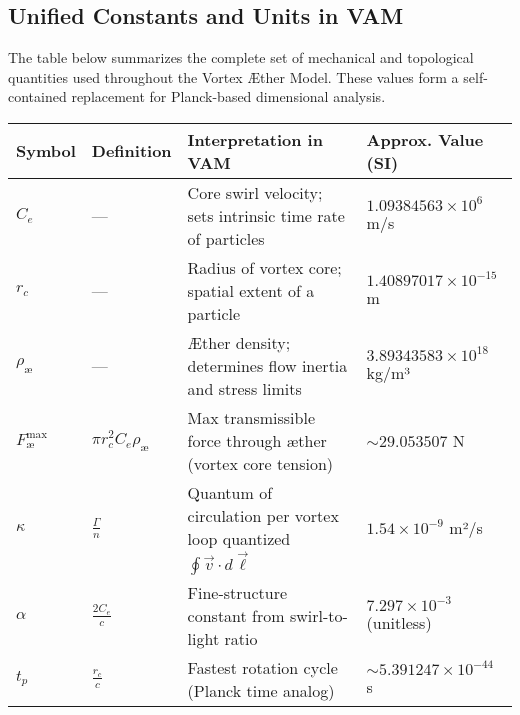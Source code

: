 \subsection*{Unified Constants and Units in VAM}

The table below summarizes the complete set of mechanical and topological quantities used throughout the Vortex Æther Model. These values form a self-contained replacement for Planck-based dimensional analysis.


\begin{table}[H]
    \centering
    \footnotesize
    \renewcommand{\arraystretch}{1.3}
    \begin{tabular}{|l|l|l|l|}
        \hline
        \textbf{Symbol} & \textbf{Definition} & \textbf{Interpretation in VAM} & \textbf{Approx. Value (SI)} \\
        \hline

        $C_e$ &
        — &
        Core swirl velocity; sets intrinsic time rate of particles &
        $1.09384563 \times 10^6$ m/s \\
        \hline

        $r_c$ &
        — &
        Radius of vortex core; spatial extent of a particle &
        $1.40897017 \times 10^{-15}$ m \\
        \hline

        $\rho_\text{\ae}$ &
        — &
        Æther density; determines flow inertia and stress limits &
        $3.89343583 \times 10^{18}$ kg/m³ \\
        \hline

        $F^{\text{max}}_{\text{\ae}}$ &
        $\pi r_c^2 C_e \rho_\text{\ae}$ &
        Max transmissible force through æther (vortex core tension) &
        $\sim 29.053507$ N \\
        \hline

        $\kappa$ &
        $\frac{\Gamma}{n}$ &
        Quantum of circulation per vortex loop  quantized $\oint \vec{v} \cdot d\vec{\ell}$ &
        $1.54 \times 10^{-9}$ m²/s \\
        \hline

        $\alpha$ &
        $\frac{2 C_e}{c}$ &
        Fine-structure constant from swirl-to-light ratio &
        $7.297 \times 10^{-3}$ (unitless) \\
        \hline

        $t_p$ &
        $\frac{r_c}{c}$ &
        Fastest rotation cycle (Planck time analog) &
        $\sim 5.391247 \times 10^{-44}$ s \\
        \hline


\end{tabular}
\end{table}
